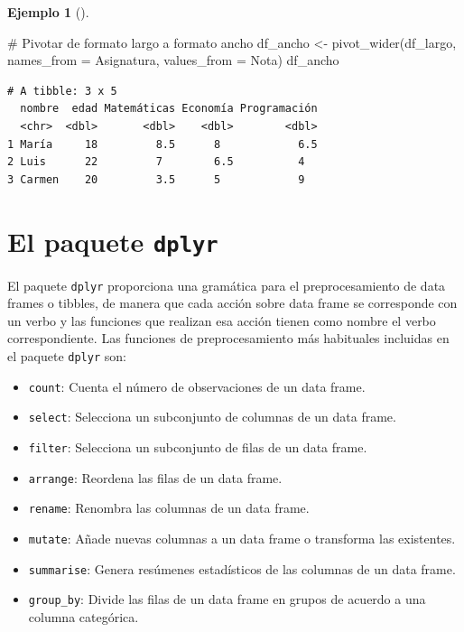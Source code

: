 \documentclass[
  a4paper,
]{scrreport}
\newenvironment{Shaded}{\begin{snugshade}}{\end{snugshade}}
\newcommand{\AttributeTok}[1]{\textcolor[rgb]{0.40,0.45,0.13}{#1}}
\newcommand{\CommentTok}[1]{\textcolor[rgb]{0.37,0.37,0.37}{#1}}
\newcommand{\FunctionTok}[1]{\textcolor[rgb]{0.28,0.35,0.67}{#1}}
\newcommand{\NormalTok}[1]{\textcolor[rgb]{0.00,0.23,0.31}{#1}}
\newcommand{\OtherTok}[1]{\textcolor[rgb]{0.00,0.23,0.31}{#1}}
\providecommand{\tightlist}{%
  \setlength{\itemsep}{0pt}\setlength{\parskip}{0pt}}\usepackage{longtable,booktabs,array}
\theoremstyle{definition}
\theoremstyle{definition}
\newtheorem{example}{Ejemplo}[chapter]
\theoremstyle{remark}
\begin{document}
\begin{example}[]
\begin{Shaded}
\begin{Highlighting}[]
\CommentTok{\# Pivotar de formato largo a formato ancho}
\NormalTok{df\_ancho }\OtherTok{\textless{}{-}} \FunctionTok{pivot\_wider}\NormalTok{(df\_largo, }\AttributeTok{names\_from =}\NormalTok{ Asignatura, }\AttributeTok{values\_from =}\NormalTok{ Nota)}
\NormalTok{df\_ancho}
\end{Highlighting}
\end{Shaded}

\begin{verbatim}
# A tibble: 3 x 5
  nombre  edad Matemáticas Economía Programación
  <chr>  <dbl>       <dbl>    <dbl>        <dbl>
1 María     18         8.5      8            6.5
2 Luis      22         7        6.5          4  
3 Carmen    20         3.5      5            9  
\end{verbatim}

\end{example}

\section{\texorpdfstring{El paquete
\texttt{dplyr}}{El paquete dplyr}}\label{el-paquete-dplyr}

El paquete \texttt{dplyr} proporciona una gramática para el
preprocesamiento de data frames o tibbles, de manera que cada acción
sobre data frame se corresponde con un verbo y las funciones que
realizan esa acción tienen como nombre el verbo correspondiente. Las
funciones de preprocesamiento más habituales incluidas en el paquete
\texttt{dplyr} son:

\begin{itemize}
\tightlist
\item
  \texttt{count}: Cuenta el número de observaciones de un data frame.
\item
  \texttt{select}: Selecciona un subconjunto de columnas de un data
  frame.
\item
  \texttt{filter}: Selecciona un subconjunto de filas de un data frame.
\item
  \texttt{arrange}: Reordena las filas de un data frame.
\item
  \texttt{rename}: Renombra las columnas de un data frame.
\item
  \texttt{mutate}: Añade nuevas columnas a un data frame o transforma
  las existentes.
\item
  \texttt{summarise}: Genera resúmenes estadísticos de las columnas de
  un data frame.
\item
  \texttt{group\_by}: Divide las filas de un data frame en grupos de
  acuerdo a una columna categórica.
\end{itemize}
\end{document}
